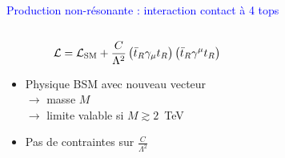 \begin{frame}
\begin{maliste}
\begin{columns}
\begin{column}{0.6\textwidth}
\begin{center}
\end{center}
\end{column}
\end{columns}
\pause
\item \textcolor{blue}{Production non-résonante : interaction contact à 4 tops}
\end{maliste}
\begin{columns}
\hspace*{1cm}
\begin{column}{0.6\textwidth}
\[{\cal L} = {\cal L}_\text{SM}+\frac{C}{\Lambda^2}\left(\bar{t}_R\gamma_{ \mu} t_R\right)\left(\bar{t}_R\gamma^{\mu} t_R\right)\]
\begin{itemize}
\item Physique BSM avec nouveau vecteur\\
$\rightarrow$ masse $M$\\
$\rightarrow$ limite valable si $M\gtrsim 2$~TeV
\item Pas de contraintes sur $\frac{C}{\Lambda^2}$
\end{itemize}
\end{column}
\hspace*{-1cm}
\begin{column}{0.4\textwidth}
\begin{figure}[!htb]
\begin{center}
\end{center}
\end{figure}

\end{column}
\end{columns}
\end{frame}
